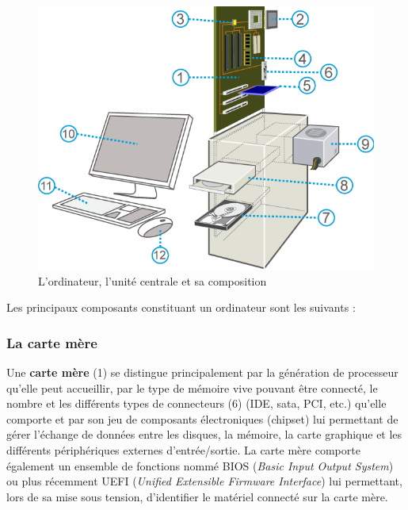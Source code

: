 \documentclass[11pt, a4paper]{book}
\begin{document}
\begin{center}
\begin{figure}[h]
	\includegraphics[scale=.6]{images/composants}
	\caption{L'ordinateur, l'unité centrale et sa composition}
	\label{composants}
\end{figure}
\end{center}

Les principaux composants constituant un ordinateur sont les suivants :

\subsubsection{La carte mère}

Une {\bf carte mère} (1) se distingue principalement par la génération de processeur qu'elle peut accueillir, par le type de mémoire vive pouvant être connecté, le nombre et les différents types de connecteurs (6) (IDE, sata, PCI, etc.) qu'elle comporte  et par son jeu de composants électroniques (chipset) lui permettant de gérer l'échange de données entre les disques, la mémoire, la carte graphique et les différents périphériques externes d'entrée/sortie. La carte mère comporte également un ensemble de fonctions nommé BIOS ({\it Basic Input Output System}) ou plus récemment UEFI ({\it Unified Extensible Firmware Interface}) lui permettant, lors de sa mise sous tension, d'identifier le matériel connecté sur la carte mère.
\end{document}
